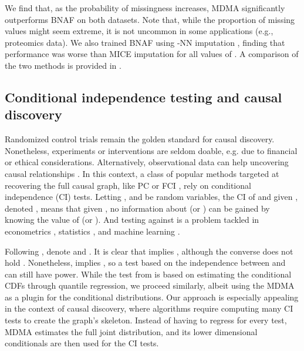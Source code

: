 \documentclass{article}
\begin{document}
We find that, as the probability of missingness increases, MDMA significantly outperforms BNAF on both datasets.
Note that, while the proportion of missing values might seem extreme, it is not uncommon in some applications (e.g., proteomics data).
We also trained BNAF using -NN imputation \cite{troyanskaya2001missing}, finding that performance was worse than MICE imputation for all values of .
A comparison of the two methods is provided in .  

\subsection{Conditional independence testing and causal discovery}

Randomized control trials \cite{Fisher1936} remain the golden standard for causal discovery.
Nonetheless, experiments or interventions are seldom doable, e.g. due to  financial or ethical considerations.
Alternatively, observational data can help uncovering causal relationships \cite{Spirtes2000, Maathuis2015}.
In this context, a class of popular methods targeted at recovering the full causal graph, like PC or FCI \citep{Spirtes2000,strobl2019}, rely on conditional independence (CI) tests.
Letting ,  and  be random variables, the CI of  and  given , denoted , means that given , no information about  (or ) can be gained by knowing the value of  (or ).
And testing  against  is a problem tackled in econometrics \citep{su2007consistent,su2008nonparametric}, statistics \citep{huang2010testing,shah2020hardness}, and machine learning \citep{zhang2011,petersen2021testing}.

Following \citep{petersen2021testing}, denote  and .
It is clear that  implies , although the converse does not hold \citep[see e.g.,][]{spanhel2016partial}.
Nonetheless,  implies , so a test based on the independence between  and  can still have power.
While the test from \citep{petersen2021testing} is based on estimating the conditional CDFs through quantile regression, we proceed similarly, albeit using the MDMA as a plugin for the conditional distributions.
Our approach is especially appealing in the context of causal discovery, where algorithms require computing many CI tests to create the graph's skeleton.
Instead of having to regress for every test, MDMA estimates the full joint distribution, and its lower dimensional conditionals are then used for the CI tests.
\end{document}
